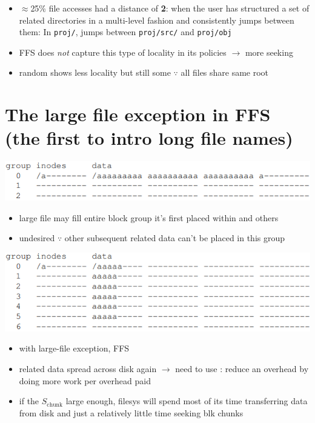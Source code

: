 \begin{itemize}
\item $\approx$25\% file accesses had a distance of \textbf{2}: when the user has structured a set of related directories in a multi-level fashion and consistently jumps between them: In \texttt{proj/}, jumps between \texttt{proj/src/} and \texttt{proj/obj}
\item FFS does \emph{not} capture this type of locality in its policies $\to$ more seeking
\item random shows less locality but still some $\because$ all files share same root
\end{itemize}
\section*{The large file exception in FFS (the first to intro long file names)}
\includegraphics[width=\linewidth]{imgs/ffs_large_file}
\begin{itemize}
\item large file may fill entire block group it's first placed within and others
\item undesired $\because$ other subsequent related data can't be placed in this group
\end{itemize}
\includegraphics[width=\linewidth]{imgs/ffs_large_file2}
\begin{itemize}
\item with large-file exception, FFS
\item related data spread across disk again $\to$ need to use : reduce an overhead by doing more work per overhead paid
\item  if the $S_{\text{chunk}}$ large enough, filesys will spend most of its time transferring data from disk and just a relatively little time seeking blk chunks \end{itemize}
